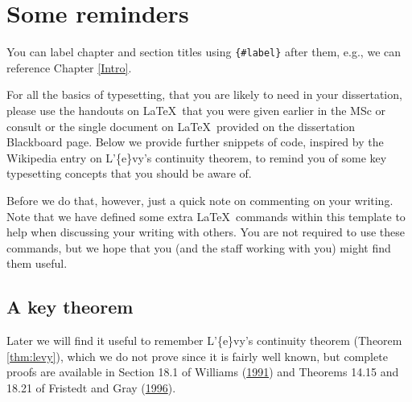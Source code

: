 \documentclass[
  12pt,
  a4paper,
  twoside]{book}
\begin{document}
\hypertarget{reminders}{%
\chapter{Some reminders}\label{reminders}}

You can label chapter and section titles using \texttt{\{\#label\}} after them, e.g., we can reference Chapter \ref{Intro}.

For all the basics of typesetting, that you are likely to need in your dissertation, please use the handouts on \LaTeX~that you were given earlier in the MSc or consult or the single document on \LaTeX~provided on the dissertation Blackboard page. Below we provide further snippets of code, inspired by the Wikipedia entry on L'\{e\}vy's continuity theorem, to remind you of some key typesetting concepts that you should be aware of.

Before we do that, however, just a quick note on commenting on your writing. Note that we have defined some extra \LaTeX~commands within this template to help when discussing your writing with others. You are not required to use these commands, but we hope that you (and the staff working with you) might find them useful.

\hypertarget{a-key-theorem}{%
\section{A key theorem}\label{a-key-theorem}}

Later we will find it useful to remember L'\{e\}vy's continuity theorem (Theorem \ref{thm:levy}), which we do not prove since it is fairly well known, but complete proofs are available in Section 18.1 of Williams (\protect\hyperlink{ref-Williams}{1991}) and Theorems 14.15 and 18.21 of Fristedt and Gray (\protect\hyperlink{ref-Fristedt}{1996}).
\end{document}
